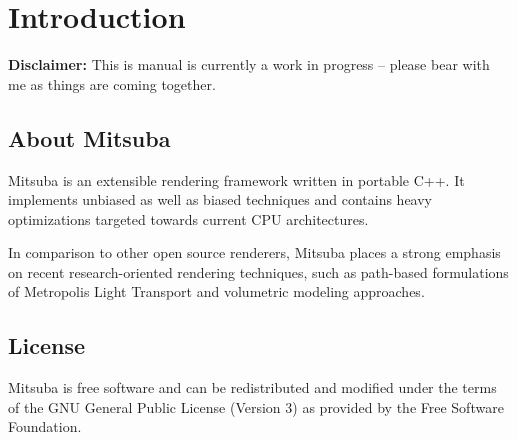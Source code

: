 \section{Introduction}
\textbf{Disclaimer:} This is manual is currently a work in progress --
please bear with me as things are coming together.

\subsection{About Mitsuba}
Mitsuba is an extensible rendering framework written in portable C++. It implements unbiased 
as well as biased techniques and contains heavy optimizations targeted towards current CPU 
architectures.

In comparison to other open source renderers, Mitsuba places a strong emphasis on recent research-oriented 
rendering techniques, such as path-based formulations of Metropolis Light Transport and volumetric
modeling approaches.

\subsection{License}
Mitsuba is free software and can be redistributed and modified under the terms of the GNU General Public License (Version 3) as provided by the Free Software Foundation.
